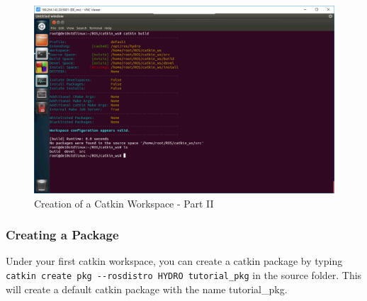 \documentclass[11pt, twoside, pdftex]{article}
\begin{document}
\begin{figure}[H]
	\begin{center}
		\includegraphics[scale=0.55]{figures/catkin_build_empty_ws.png}
		\caption{Creation of a Catkin Workspace - Part II}
		\label{fig:catkinbuildemptyws}
	\end{center}
\end{figure}
                    
\subsubsection{Creating a Package}
Under your first catkin workspace, you can create a catkin package by typing \lstinline|catkin create pkg --rosdistro HYDRO tutorial_pkg| in the source folder. This will create a default catkin package with the name {\sf tutorial\_pkg}.
\end{document}
